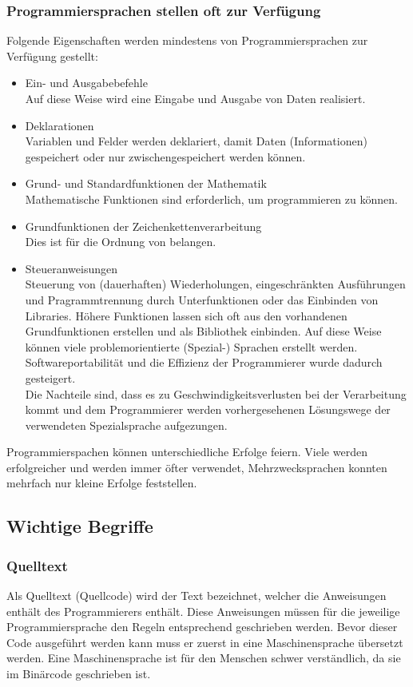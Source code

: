 \documentclass[12pt,a4paper]{report}
\begin{document}
\begin{onehalfspace}
\subsubsection{Programmiersprachen stellen oft zur Verfügung}
Folgende Eigenschaften werden mindestens von Programmiersprachen zur Verfügung gestellt:
\begin{itemize}
\item Ein- und Ausgabebefehle\\
Auf diese Weise wird eine Eingabe und Ausgabe von Daten realisiert.
\item Deklarationen\\
Variablen und Felder werden deklariert, damit Daten (Informationen) gespeichert oder nur zwischengespeichert werden können.
\item Grund- und Standardfunktionen der Mathematik\\
Mathematische Funktionen sind erforderlich, um programmieren zu können.
\item Grundfunktionen der Zeichenkettenverarbeitung\\
Dies ist für die Ordnung von belangen.
\item Steueranweisungen\\
Steuerung von (dauerhaften) Wiederholungen, eingeschränkten Ausführungen und Pragrammtrennung durch Unterfunktionen oder das Einbinden von Libraries. Höhere Funktionen lassen sich oft aus den vorhandenen Grundfunktionen erstellen und als Bibliothek einbinden. Auf diese Weise können viele problemorientierte (Spezial-) Sprachen erstellt werden. Softwareportabilität und die Effizienz der Programmierer wurde dadurch gesteigert.\\
Die Nachteile sind, dass es zu Geschwindigkeitsverlusten bei der Verarbeitung kommt und dem Programmierer werden vorhergesehenen Lösungswege der verwendeten Spezialsprache aufgezungen.
\end{itemize}
Programmierspachen können unterschiedliche Erfolge feiern. Viele werden erfolgreicher und werden immer öfter verwendet,  Mehrzwecksprachen konnten mehrfach nur kleine Erfolge feststellen.

\subsection{Wichtige Begriffe}
\subsubsection{Quelltext}
Als Quelltext (Quellcode) wird der Text bezeichnet, welcher die Anweisungen enthält des Programmierers enthält. Diese Anweisungen müssen für die jeweilige Programmiersprache den Regeln entsprechend geschrieben werden. Bevor dieser Code ausgeführt werden kann muss er zuerst in eine Maschinensprache übersetzt werden. Eine Maschinensprache ist für den Menschen schwer verständlich, da sie im Binärcode geschrieben ist.


\end{onehalfspace}
\end{document}
